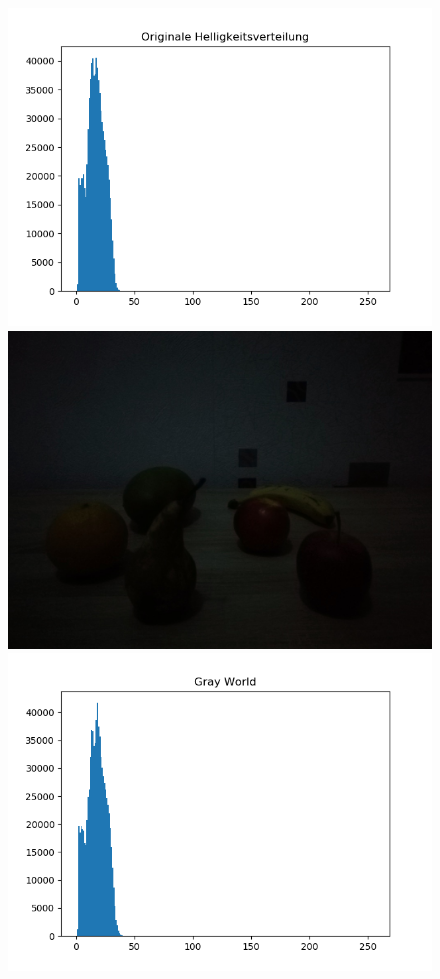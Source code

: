 \begin{appendices}
\begin{figure}[htbp]
\begin{minipage}{0.49\textwidth}
\includegraphics[width=\textwidth]{Sources/Anhang/resize_0250.png}
\end{minipage}
\begin{minipage}{0.49\textwidth}
\includegraphics[width=.8\textwidth]{Sources/Anhang/resize_0250_GW.jpg}
\end{minipage}
\begin{minipage}{0.49\textwidth}
\includegraphics[width=\textwidth]{Sources/Anhang/resize_0250_GW.png}

\end{minipage}
\end{figure}
\end{appendices}
